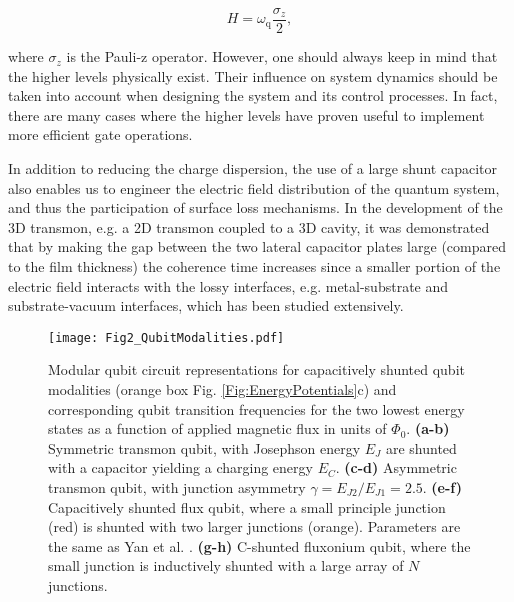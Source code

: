 \documentclass[aip,apr,twocolumn,showpacs,superscriptaddress,groupedaddress,nofootinbib,reprint]{revtex4-1}  %
\newcommand{\freq}{\omega_\text{q}}
\begin{document}
\begin{equation}
H = \freq \frac{\sigma_{z}}{2},
\label{Eq:HTwoLevelSystem}
\end{equation}

\noindent where $\sigma_{z}$ is the Pauli-z operator. However, one should always keep in mind that the higher levels physically exist\cite{Peterer2015}. Their influence on system dynamics should be taken into account when designing the system and its control processes. In fact, there are many cases where the higher levels have proven useful to implement more efficient gate operations\cite{DiCarlo2010}.

In addition to reducing the charge dispersion, the use of a large shunt capacitor also enables us to engineer the electric field distribution of the quantum system, and thus the participation of surface loss mechanisms. In the development of the 3D transmon\cite{Paik2011}, e.g. a 2D transmon coupled to a 3D cavity, it was demonstrated that by making the gap between the two lateral capacitor plates large (compared to the film thickness) the coherence time increases since a smaller portion of the electric field interacts with the lossy interfaces, e.g. metal-substrate and substrate-vacuum interfaces, which has been studied extensively\cite{Shnirman2005,Gao2007,Wenner2011,Zeng2015a,Zeng2015b,Calusine2018}.

\begin{figure*}[htp]
\begin{center}
\texttt{[image: Fig2\_QubitModalities.pdf]}
\caption{Modular qubit circuit representations for capacitively shunted qubit modalities (orange box Fig. \ref{Fig:EnergyPotentials}c) and corresponding qubit transition frequencies for the two lowest energy states as a function of applied magnetic flux in units of $\Phi_0$. \textbf{(a-b)} Symmetric transmon qubit, with Josephson energy $E_J$ are shunted with a capacitor yielding a charging energy $E_C$. \textbf{(c-d)} Asymmetric transmon qubit, with junction asymmetry $\gamma = E_{J2}/E_{J1} = 2.5$. \textbf{(e-f)} Capacitively shunted flux qubit, where a small principle junction (red) is shunted with two larger junctions (orange). Parameters are the same as Yan et al. \cite{Yan2016}. \textbf{(g-h)} C-shunted fluxonium qubit, where the small junction is inductively shunted with a large array of $N$ junctions.}
\label{Fig:QubitModalities}
\end{center}
\end{figure*}
\end{document}
